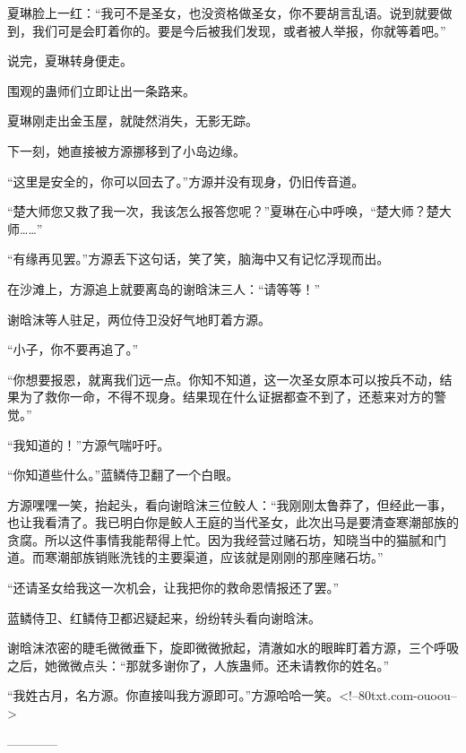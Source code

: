 \begin{this_body}
夏琳脸上一红：“我可不是圣女，也没资格做圣女，你不要胡言乱语。说到就要做到，我们可是会盯着你的。要是今后被我们发现，或者被人举报，你就等着吧。”

说完，夏琳转身便走。

围观的蛊师们立即让出一条路来。

夏琳刚走出金玉屋，就陡然消失，无影无踪。

下一刻，她直接被方源挪移到了小岛边缘。

“这里是安全的，你可以回去了。”方源并没有现身，仍旧传音道。

“楚大师您又救了我一次，我该怎么报答您呢？”夏琳在心中呼唤，“楚大师？楚大师……”

“有缘再见罢。”方源丢下这句话，笑了笑，脑海中又有记忆浮现而出。

在沙滩上，方源追上就要离岛的谢晗沫三人：“请等等！”

谢晗沫等人驻足，两位侍卫没好气地盯着方源。

“小子，你不要再追了。”

“你想要报恩，就离我们远一点。你知不知道，这一次圣女原本可以按兵不动，结果为了救你一命，不得不现身。结果现在什么证据都查不到了，还惹来对方的警觉。”

“我知道的！”方源气喘吁吁。

“你知道些什么。”蓝鳞侍卫翻了一个白眼。

方源嘿嘿一笑，抬起头，看向谢晗沫三位鲛人：“我刚刚太鲁莽了，但经此一事，也让我看清了。我已明白你是鲛人王庭的当代圣女，此次出马是要清查寒潮部族的贪腐。所以这件事情我能帮得上忙。因为我经营过赌石坊，知晓当中的猫腻和门道。而寒潮部族销账洗钱的主要渠道，应该就是刚刚的那座赌石坊。”

“还请圣女给我这一次机会，让我把你的救命恩情报还了罢。”

蓝鳞侍卫、红鳞侍卫都迟疑起来，纷纷转头看向谢晗沫。

谢晗沫浓密的睫毛微微垂下，旋即微微掀起，清澈如水的眼眸盯着方源，三个呼吸之后，她微微点头：“那就多谢你了，人族蛊师。还未请教你的姓名。”

“我姓古月，名方源。你直接叫我方源即可。”方源哈哈一笑。<!--80txt.com-ouoou-->

------------

\end{this_body}


